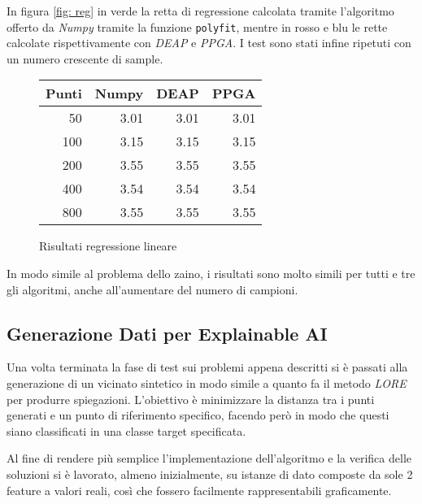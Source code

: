 In figura \ref{fig: reg} in verde la retta di regressione calcolata tramite
l'algoritmo offerto da \textit{Numpy} tramite la funzione \verb|polyfit|,
mentre in rosso e blu le rette calcolate rispettivamente con \textit{DEAP} e
\textit{PPGA}. I test sono stati infine ripetuti con un numero crescente di
sample.

\begin{figure}[H]
	\centering
	\begin{minipage}{0.45\linewidth}
		\centering
		\begin{tabular}{rrrr}
			\toprule
			Punti & Numpy & DEAP & PPGA \\
			\midrule
			50    & 3.01  & 3.01 & 3.01 \\
			100   & 3.15  & 3.15 & 3.15 \\
			200   & 3.55  & 3.55 & 3.55 \\
			400   & 3.54  & 3.54 & 3.54 \\
			800   & 3.55  & 3.55 & 3.55 \\
			\bottomrule
		\end{tabular}
	\end{minipage}
	\hfill
	\begin{minipage}{0.5\linewidth}
		\centering
		
	\end{minipage}
	\caption{Risultati regressione lineare}
	\label{fig: regression}
\end{figure}

In modo simile al problema dello zaino, i risultati sono molto simili per tutti
e tre gli algoritmi, anche all'aumentare del numero di campioni.

\subsection{Generazione Dati per Explainable AI}

Una volta terminata la fase di test sui problemi appena descritti si è passati
alla generazione di un vicinato sintetico in modo simile a quanto fa il metodo
\textit{LORE} per produrre spiegazioni. L'obiettivo è minimizzare la distanza
tra i punti generati e un punto di riferimento specifico, facendo però in modo
che questi siano classificati in una classe target specificata.

Al fine di rendere più semplice l'implementazione dell'algoritmo e la verifica
delle soluzioni si è lavorato, almeno inizialmente, su istanze di dato composte
da sole 2 feature a valori reali, così che fossero facilmente rappresentabili
graficamente.

